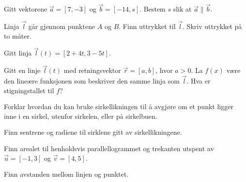 Gitt vektorene $\vec{a}=[7, -3]$ og $\vec{b}=[-14, s]$. Bestem $s$ slik at $\vec{a}\parallel\vec{b}$. 

\nes

Linja $\vec{l}$ går gjennom punktene $A$ og $B$. Finn uttrykket til $\vec{l}$. Skriv uttrykket på to måter. \os
{}

Gitt linja $\vec{l}(t)=[2+4t, 3-5t]$.

Gitt en linje $\vec{l}(t)$ med retningsvektor $\vec{r}=[a, b]$, hvor $a>0$. La $f(x)$ være den lineære funksjonen som beskriver den samme linja som $\vec{l}$. Hva er stigningstallet til $f$?


\nes
{}
Forklar hvordan du kan bruke sirkellikningen til å avgjøre om et punkt ligger inne i en sirkel, utenfor sirkelen, eller på sirkelbuen. 

\newpage
{}
Finn sentrene og radiene til sirklene gitt av sirkellikningene.

\nes
{}
Finn arealet til henholdsvis parallellogrammet og trekanten utspent av $\vec{u}=[-1, 3]$ og $\vec{v}=[4, 5]$.

Finn avstanden mellom linjen og punktet. \os
{}

 \vs
{}

